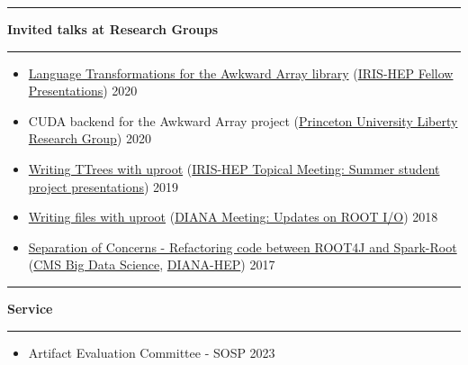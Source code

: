 \documentclass[10pt, letterpaper]{article}
\newcommand{\Section}[1]{
    \Line \par
    \vspace{1pt}
    \textbf{\fontsize{13}{13}\selectfont #1} \par
    \vspace{-7pt}
    \Line \par
    \vspace{3pt}
}
\newcommand{\Line}{
\noindent\rule{\textwidth}{0.4pt}}
\newenvironment{tightitemize}
{
    \vspace{-\topsep}
    \begin{itemize}
        \itemsep2pt \parskip0pt \parsep0pt
}
{
    \end{itemize}
    \vspace{-\topsep}
}
\begin{document}
\Section{Invited talks at Research Groups}
\small{\begin{tightitemize}
\item \href{https://indico.cern.ch/event/946427/contributions/3976986/attachments/2094014/3519161/IRIS-HEP-Fellow-Awkward.pdf}{Language Transformations for the Awkward Array library} (\href{https://indico.cern.ch/event/946427/}{IRIS-HEP Fellow Presentations}) \hfill{2020}
\item CUDA backend for the Awkward Array project (\href{https://liberty.princeton.edu/}{Princeton University Liberty Research Group}) \hfill{2020}
\item \href{https://indico.cern.ch/event/840667/contributions/3527109/attachments/1908764/3153297/uproot-irisfellow-final.pdf}{Writing TTrees with uproot} (\href{https://indico.cern.ch/event/840667/}{IRIS-HEP Topical Meeting: Summer student project presentations}) \hfill{2019}
\item \href{https://indico.cern.ch/event/754335/contributions/3166239/attachments/1734208/2804184/Writing_files_with_uproot_-_DIANA_HEP.pdf}{Writing files with uproot} (\href{https://indico.cern.ch/event/754335/}{DIANA Meeting: Updates on ROOT I/O}) \hfill{2018}
\item \href{https://indico.cern.ch/event/658754/contributions/2685907/attachments/1506368/2347492/Refactoring_code_from_spark-root_to_root4j.pdf}{Separation of Concerns - Refactoring code between ROOT4J and Spark-Root} (\href{https://indico.cern.ch/event/658754/}{CMS Big Data Science}, \href{https://indico.cern.ch/event/655833/}{DIANA-HEP}) \hfill{2017}
\end{tightitemize}}

\Section{Service}
\begin{tightitemize}
\item Artifact Evaluation Committee - SOSP 2023
\end{tightitemize}
\end{document}
